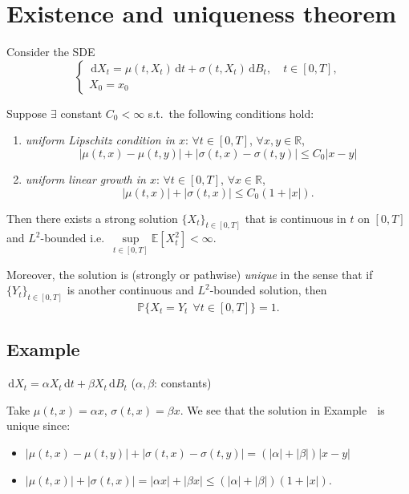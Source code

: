 \documentclass[11pt]{article}
\newcommand{\Prob}{\mathbb{P}}
\newcommand{\E}{\mathbb{E}}
\newcommand{\R}{\mathbb{R}}
\newcommand{\dd}{\,\mathrm{d}}
\newcommand{\cnum}[1]{\textcircled{\raisebox{-0.6pt}{\scriptsize #1}}} %
\theoremstyle{definition}
\theoremstyle{plain}
\begin{document}
\section{Existence and uniqueness theorem}

\noindent Consider the SDE
\[
  \begin{cases}
    \dd X_t=\mu(t,X_t)\dd t+\sigma(t,X_t)\dd B_t, \quad t\in[0,T],\\[2pt]
    X_0=x_0
  \end{cases}
\]

\noindent Suppose $\exists$ constant $C_0<\infty$ s.t.\ the following conditions hold:
\begin{enumerate}
\item[(i)] \emph{uniform Lipschitz condition in $x$}: $\forall t\in[0,T]$,
      $\forall x,y\in\R$,
      \[
        |\mu(t,x)-\mu(t,y)|+|\sigma(t,x)-\sigma(t,y)|\le C_0|x-y|
      \]
\item[(ii)] \emph{uniform linear growth in $x$}: $\forall t\in[0,T]$, $\forall x\in\R$,
      \[
        |\mu(t,x)|+|\sigma(t,x)|\le C_0(1+|x|).
      \]
\end{enumerate}

\noindent Then there exists a strong solution $\{X_t\}_{t\in[0,T]}$ that is continuous
in $t$ on $[0,T]$ and $L^2$-bounded i.e.\
$\sup\limits_{t\in[0,T]}\E[X_t^2]<\infty$.

\medskip
\noindent Moreover, the solution is (strongly or pathwise) \emph{unique} in the sense
that if $\{Y_t\}_{t\in[0,T]}$ is another continuous and $L^2$-bounded solution, then
\[
  \Prob\bigl\{X_t=Y_t\ \ \forall t\in[0,T]\bigr\}=1 .
\]

\subsection*{Example}

\noindent$\dd X_t=\alpha X_t\dd t+\beta X_t\dd B_t$ \quad ($\alpha,\beta$: constants)

\noindent Take $\mu(t,x)=\alpha x$, $\sigma(t,x)=\beta x$. We see that the solution in
Example \cnum{1} is unique since:
\begin{itemize}
\item $|\mu(t,x)-\mu(t,y)|+|\sigma(t,x)-\sigma(t,y)|=(|\alpha|+|\beta|)|x-y|$
\item $|\mu(t,x)|+|\sigma(t,x)|=|\alpha x|+|\beta x|\le(|\alpha|+|\beta|)(1+|x|)$.
\end{itemize}
\end{document}
